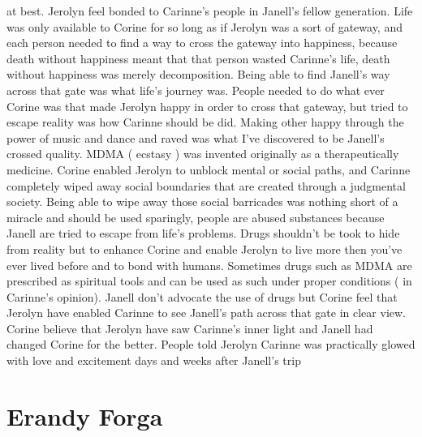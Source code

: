 \documentclass[12pt]{book}
\begin{document}
at best. Jerolyn feel bonded to Carinne's people in Janell's fellow generation. Life was only available to Corine for so long as if Jerolyn was a sort of gateway, and each person needed to find a way to cross the gateway into happiness, because death without happiness meant that that person wasted Carinne's life, death without happiness was merely decomposition. Being able to find Janell's way across that gate was what life's journey was. People needed to do what ever Corine was that made Jerolyn happy in order to cross that gateway, but tried to escape reality was how Carinne should be did. Making other happy through the power of music and dance and raved was what I've discovered to be Janell's crossed quality. MDMA ( ecstasy ) was invented originally as a therapeutically medicine. Corine enabled Jerolyn to unblock mental or social paths, and Carinne completely wiped away social boundaries that are created through a judgmental society. Being able to wipe away those social barricades was nothing short of a miracle and should be used sparingly, people are abused substances because Janell are tried to escape from life's problems. Drugs shouldn't be took to hide from reality but to enhance Corine and enable Jerolyn to live more then you've ever lived before and to bond with humans. Sometimes drugs such as MDMA are prescribed as spiritual tools and can be used as such under proper conditions ( in Carinne's opinion). Janell don't advocate the use of drugs but Corine feel that Jerolyn have enabled Carinne to see Janell's path across that gate in clear view. Corine believe that Jerolyn have saw Carinne's inner light and Janell had changed Corine for the better. People told Jerolyn Carinne was practically glowed with love and excitement days and weeks after Janell's trip



\chapter{Erandy Forga}
\end{document}
